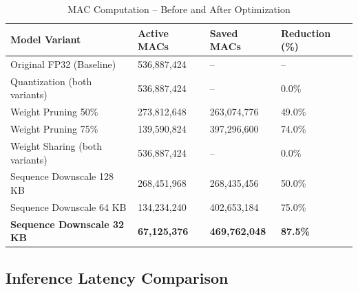 \documentclass[12pt,a4paper]{article}
\begin{document}
\begin{table}[h!]
\centering
\caption{MAC Computation -- Before and After Optimization}
\renewcommand{\arraystretch}{1.4}
\begin{tabular}{L{4.5cm} R{2.8cm} R{2.8cm} R{2.2cm}}
\toprule
{}
\color{white}\textbf{Model Variant} &
\color{white}\textbf{Active MACs} &
\color{white}\textbf{Saved MACs} &
\color{white}\textbf{Reduction (\%)} \\
\midrule
Original FP32 (Baseline)          & 536,887,424 & --          & -- \\
Quantization (both variants)      & 536,887,424 & --          & 0.0\% \\
Weight Pruning 50\%               & 273,812,648 & 263,074,776 & 49.0\% \\
Weight Pruning 75\%               & 139,590,824 & 397,296,600 & 74.0\% \\
Weight Sharing (both variants)    & 536,887,424 & --          & 0.0\% \\
Sequence Downscale 128 KB         & 268,451,968 & 268,435,456 & 50.0\% \\
Sequence Downscale 64 KB          & 134,234,240 & 402,653,184 & 75.0\% \\
\textbf{Sequence Downscale 32 KB} & \textbf{67,125,376}  & \textbf{469,762,048} & \textbf{87.5\%} \\
\bottomrule
\end{tabular}
\end{table}

\subsection{Inference Latency Comparison}
\end{document}
